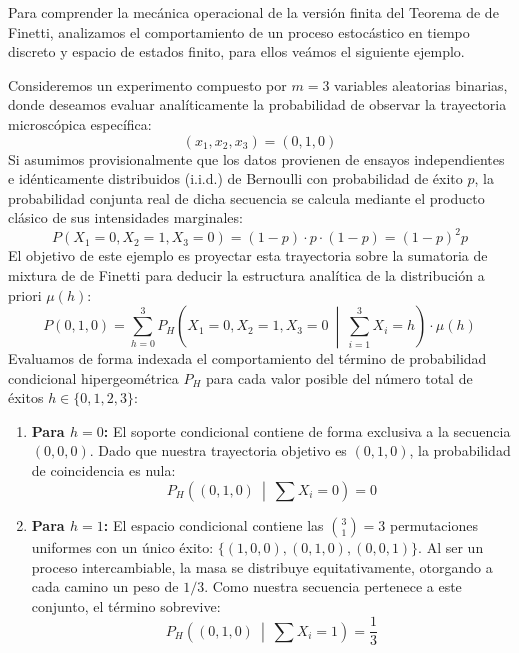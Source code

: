 \noindent
Para comprender la mecánica operacional de la versión finita del Teorema de de Finetti, analizamos el comportamiento de un proceso estocástico en tiempo discreto y espacio de estados finito, para ellos veámos el siguiente ejemplo. \\

\begin{ejemplo}
    Consideremos un experimento compuesto por $m=3$ variables aleatorias binarias, donde deseamos evaluar analíticamente la probabilidad de observar la trayectoria microscópica específica:
    \begin{equation*}
        (x_1, x_2, x_3) = (0, 1, 0)
    \end{equation*}
    \noindent
    Si asumimos provisionalmente que los datos provienen de ensayos independientes e idénticamente distribuidos (i.i.d.) de Bernoulli con probabilidad de éxito $p$, la probabilidad conjunta real de dicha secuencia se calcula mediante el producto clásico de sus intensidades marginales:
    \begin{equation*}
        P(X_1 = 0, X_2 = 1, X_3 = 0) = (1-p) \cdot p \cdot (1-p) = (1-p)^2 p
    \end{equation*}
    El objetivo de este ejemplo es proyectar esta trayectoria sobre la sumatoria de mixtura de de Finetti para deducir la estructura analítica de la distribución a priori $\mu(h)$:
    \begin{equation*}
        P(0, 1, 0) = \sum_{h=0}^{3} P_H \left( X_1 = 0, X_2 = 1, X_3 = 0 \ \middle| \ \sum_{i=1}^{3} X_i = h \right) \cdot \mu(h)
    \end{equation*}
    Evaluamos de forma indexada el comportamiento del término de probabilidad condicional hipergeométrica $P_H$ para cada valor posible del número total de éxitos $h \in \{0, 1, 2, 3\}$:

    \begin{enumerate}
        \item \textbf{Para $h=0$:} El soporte condicional contiene de forma exclusiva a la secuencia $(0,0,0)$. Dado que nuestra trayectoria objetivo es $(0,1,0)$, la probabilidad de coincidencia es nula:
        \begin{equation*}
            P_H \left( (0,1,0) \ \middle| \ \sum X_i = 0 \right) = 0
        \end{equation*}
        
        \item \textbf{Para $h=1$:} El espacio condicional contiene las $\binom{3}{1} = 3$ permutaciones uniformes con un único éxito: $\{(1,0,0), (0,1,0), (0,0,1)\}$. Al ser un proceso intercambiable, la masa se distribuye equitativamente, otorgando a cada camino un peso de $1/3$. Como nuestra secuencia pertenece a este conjunto, el término sobrevive:
        \begin{equation*}
            P_H \left( (0,1,0) \ \middle| \ \sum X_i = 1 \right) = \frac{1}{3}
        \end{equation*}
        

\end{enumerate}
\end{ejemplo}
